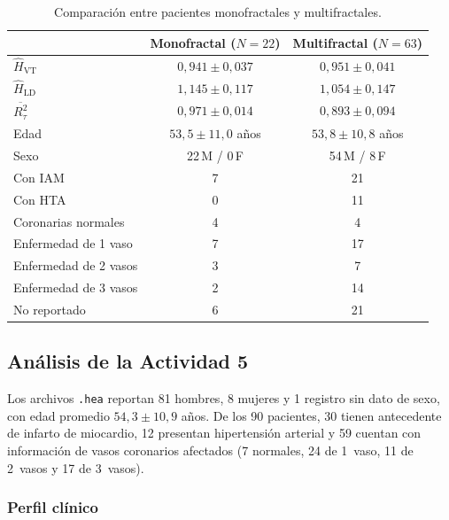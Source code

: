 \begin{table}[H]
\centering
\caption{Comparación entre pacientes monofractales y multifractales.}
\label{tab:mono-vs-multi}
\renewcommand{\arraystretch}{1.3}
\begin{tabular}{lcc}
    \toprule
    & \textbf{Monofractal} ($N=22$) & \textbf{Multifractal} ($N=63$) \\
    \midrule
    $\hat{H}_{\text{VT}}$
        & $0{,}941 \pm 0{,}037$ & $0{,}951 \pm 0{,}041$ \\
    $\hat{H}_{\text{LD}}$
        & $1{,}145 \pm 0{,}117$ & $1{,}054 \pm 0{,}147$ \\
    $\overline{R^2_{\tau}}$
        & $0{,}971 \pm 0{,}014$ & $0{,}893 \pm 0{,}094$ \\
    \midrule
    Edad & $53{,}5 \pm 11{,}0$ años & $53{,}8 \pm 10{,}8$ años \\
    Sexo & 22\,M / 0\,F & 54\,M / 8\,F \\
    \midrule
    Con IAM  & 7 & 21 \\
    Con HTA  & 0 & 11 \\
    \midrule
    Coronarias normales    & 4 & 4 \\
    Enfermedad de 1 vaso   & 7 & 17 \\
    Enfermedad de 2 vasos  & 3 & 7 \\
    Enfermedad de 3 vasos  & 2 & 14 \\
    No reportado           & 6 & 21 \\
    \bottomrule
\end{tabular}
\end{table}


\subsection{Análisis de la Actividad 5}

Los archivos \texttt{.hea} reportan 81 hombres, 8 mujeres y 1 registro
sin dato de sexo, con edad promedio $54{,}3 \pm 10{,}9$ años. De los 90
pacientes, 30 tienen antecedente de infarto de miocardio, 12 presentan
hipertensión arterial y 59 cuentan con información de vasos coronarios
afectados (7 normales, 24 de 1~vaso, 11 de 2~vasos y 17 de 3~vasos).

\subsubsection{Perfil clínico}

